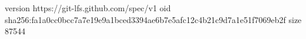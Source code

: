 version https://git-lfs.github.com/spec/v1
oid sha256:fa1a0cc0bcc7a7e19e9a1bced3394ae6b7e5afc12c4b21c9d7a1e51f7069eb2f
size 87544
